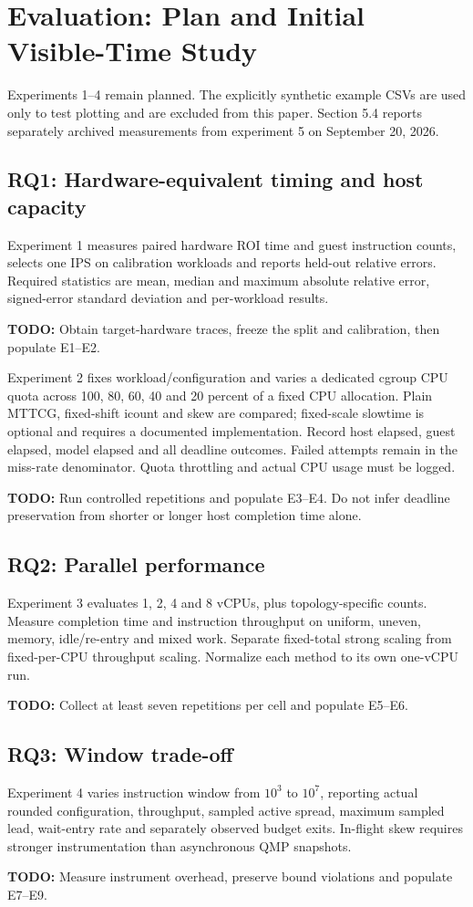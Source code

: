 \documentclass[10pt]{article}
\newcommand{\todo}[1]{\par\noindent\textbf{TODO:} #1\par}
\begin{document}
\section{Evaluation: Plan and Initial Visible-Time Study}
Experiments 1--4 remain planned. The explicitly synthetic example CSVs are used
only to test plotting and are excluded from this paper. Section 5.4 reports
separately archived measurements from experiment 5 on September 20, 2026.

\subsection{RQ1: Hardware-equivalent timing and host capacity}
Experiment 1 measures paired hardware ROI time and guest instruction counts,
selects one IPS on calibration workloads and reports held-out relative errors.
Required statistics are mean, median and maximum absolute relative error,
signed-error standard deviation and per-workload results.
\todo{Obtain target-hardware traces, freeze the split and calibration, then populate E1--E2.}

Experiment 2 fixes workload/configuration and varies a dedicated cgroup CPU
quota across 100, 80, 60, 40 and 20 percent of a fixed CPU allocation. Plain
MTTCG, fixed-shift icount and skew are compared; fixed-scale slowtime is optional
and requires a documented implementation. Record host elapsed, guest elapsed,
model elapsed and all deadline outcomes. Failed attempts remain in the miss-rate
denominator. Quota throttling and actual CPU usage must be logged.
\todo{Run controlled repetitions and populate E3--E4. Do not infer deadline
preservation from shorter or longer host completion time alone.}

\subsection{RQ2: Parallel performance}
Experiment 3 evaluates 1, 2, 4 and 8 vCPUs, plus topology-specific counts.
Measure completion time and instruction throughput on uniform, uneven, memory,
idle/re-entry and mixed work. Separate fixed-total strong scaling from
fixed-per-CPU throughput scaling. Normalize each method to its own one-vCPU run.
\todo{Collect at least seven repetitions per cell and populate E5--E6.}

\subsection{RQ3: Window trade-off}
Experiment 4 varies instruction window from $10^3$ to $10^7$, reporting actual
rounded configuration, throughput, sampled active spread, maximum sampled lead,
wait-entry rate and separately observed budget exits. In-flight skew requires
stronger instrumentation than asynchronous QMP snapshots.
\todo{Measure instrument overhead, preserve bound violations and populate E7--E9.}
\end{document}
